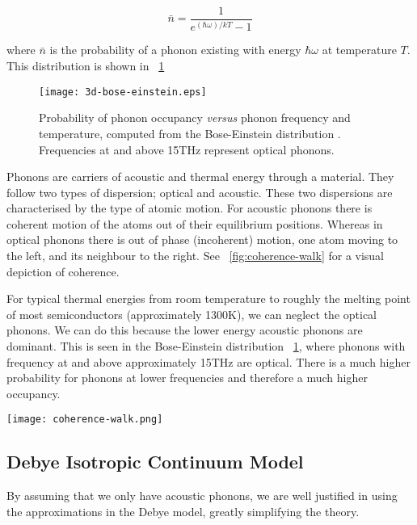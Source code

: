 \documentclass[12pt]{article}
\newcommand{\figref}[2][\figurename~]{#1\ref{#2}}
\begin{document}
\begin{equation}
\label{bose-einstein}
	 \bar{n} = \frac{1}{e^{(\hbar \omega) / k T} - 1}
\end{equation}

where $\bar{n}$ is the probability of a phonon existing with energy $\hbar \omega$ at temperature $T$. This distribution is shown in \figref{fig:3d-bose-einstein}

\begin{figure}
	\centering
	\texttt{[image: 3d-bose-einstein.eps]}
	\caption{Probability of phonon occupancy \emph{versus} phonon frequency and temperature, computed from the Bose-Einstein distribution \cite{kittel}. Frequencies at and above 15THz represent optical phonons.}
	\label{fig:3d-bose-einstein}
\end{figure}

Phonons are carriers of acoustic and thermal energy through a material. They follow two types of dispersion; optical and acoustic. These two dispersions are characterised by the type of atomic motion. For acoustic phonons there is coherent motion of the atoms out of their equilibrium positions. Whereas in optical phonons there is out of phase (incoherent) motion, one atom moving to the left, and its neighbour to the right. See \figref{fig:coherence-walk} for a visual depiction of coherence.

For typical thermal energies from room temperature to roughly the melting point of most semiconductors (approximately 1300K), we can neglect the optical phonons. We can do this because the lower energy acoustic phonons are dominant. This is seen in the Bose-Einstein distribution \figref{fig:3d-bose-einstein}, where phonons with frequency at and above approximately 15THz are optical. There is a much higher probability for phonons at lower frequencies and therefore a much higher occupancy.

\begin{SCfigure}
	\centering
	\texttt{[image: coherence-walk.png]}
	\caption{An incoherent walk, contrasted with a coherent walk. For the coherent walk, the `atoms' keep step, they are in phase with their neighbours. For the incoherent walk, the `atoms' move in all directions, out of phase with each other.}
	\label{fig:coherence-walk}
\end{SCfigure}

\subsection{Debye Isotropic Continuum Model}
By assuming that we only have acoustic phonons, we are well justified in using the approximations in the Debye model, greatly simplifying the theory.
\end{document}
